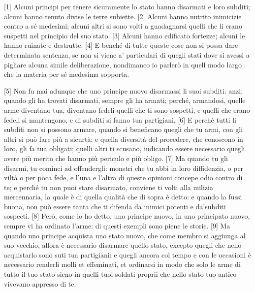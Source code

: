 
{[}1{]} Alcuni principi per tenere sicuramente lo stato hanno disarmati
e loro subditi; alcuni hanno tenuto divise le terre subiette. {[}2{]}
Alcuni hanno nutrito inimicizie contro a sé medesimi; alcuni altri si
sono volti a guadagnarsi quelli che li erano suspetti nel principio del
suo stato. {[}3{]} Alcuni hanno edificato fortezze; alcuni le hanno
ruinate e destrutte. {[}4{]} E benché di tutte queste cose non si possa
dare determinata sentenza, se non si viene a' particulari di quegli
stati dove si avessi a pigliare alcuna simile deliberazione, nondimanco
io parlerò in quell modo largo che la materia per sé medesima sopporta.

{[}5{]} Non fu mai adunque che uno principe nuovo disarmassi li suoi
subditi: anzi, quando gli ha trovati disarmati, sempre gli ha armati;
perché, armandosi, quelle arme diventano tua, diventano fedeli quelli
che ti sono sospetti, e quelli che erano fedeli si mantengono, e di
subditi si fanno tua partigiani. {[}6{]} E perché tutti li subditi non
si possono armare, quando si beneficano quegli che tu armi, con gli
altri si può fare più a sicurtà: e quella diversità del procedere, che
conoscono in loro, gli fa tua obligati; quelli altri ti scusano,
iudicando essere necessario quegli avere più merito che hanno più
periculo e più obligo. {[}7{]} Ma quando tu gli disarmi, tu cominci ad
offendergli: monstri che tu abbi in loro diffidenzia, o per viltà o per
poca fede, e l'una e l'altra di queste opinioni concepe odio contro di
te; e perché tu non puoi stare disarmato, conviene ti volti alla milizia
mercennaria, la quale è di quella qualità che di sopra è detto: e quando
la fussi buona, non può essere tanta che ti difenda da inimici potenti e
da'subditi sospecti. {[}8{]} Però, come io ho detto, uno principe nuovo,
in uno principato nuovo, sempre vi ha ordinato l'arme: di questi exempli
sono piene le storie. {[}9{]} Ma quando uno principe acquista uno stato
nuovo, che come membro si aggiunga al suo vecchio, allora è necessario
disarmare quello stato, excepto quegli che nello acquistarlo sono suti
tua partigiani: e quegli ancora col tempo e con le occasioni è
necessario renderli molli et effeminati, et ordinarsi in modo che solo
le arme di tutto il tuo stato sieno in quelli tuoi soldati proprii che
nello stato tuo antico vivevano appresso di te.

